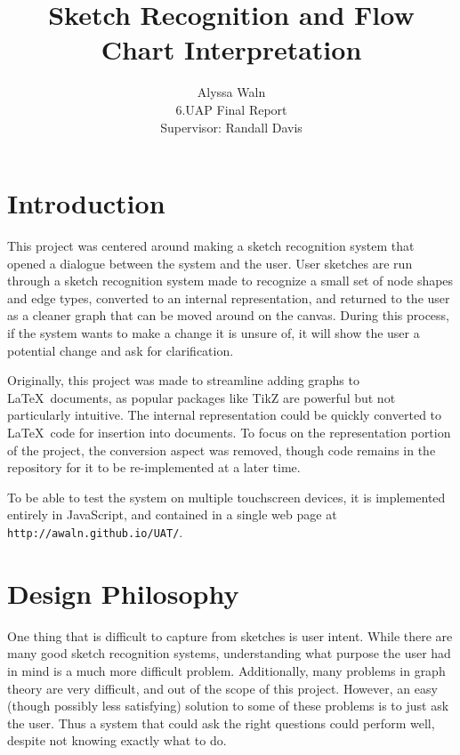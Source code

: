 \documentclass[12pt]{article}
\title{\textbf{Sketch Recognition and Flow Chart Interpretation}}
\author{Alyssa Waln \\ 6.UAP Final Report \\ Supervisor: Randall Davis}
\begin{document}
\maketitle

\tableofcontents

\section{Introduction}
\par This project was centered around making a sketch recognition system that opened a dialogue between the system and the user. User sketches are run through a sketch recognition system made to recognize a small set of node shapes and edge types, converted to an internal representation, and returned to the user as a cleaner graph that can be moved around on the canvas. During this process, if the system wants to make a change it is unsure of, it will show the user a potential change and ask for clarification.\\

\par Originally, this project was made to streamline adding graphs to \LaTeX \ documents, as popular packages like TikZ\cite{TikZ} are powerful but not particularly intuitive. The internal representation could be quickly converted to \LaTeX \ code for insertion into documents. To focus on the representation portion of the project, the conversion aspect was removed, though code remains in the repository\cite{repo} for it to be re-implemented at a later time.

\par To be able to test the system on multiple touchscreen devices, it is implemented entirely in JavaScript, and contained in a single web page at \texttt{http://awaln.github.io/UAT/}.

\section{Design Philosophy}
\par One thing that is difficult to capture from sketches is user intent. While there are many good sketch recognition systems, understanding what purpose the user had in mind is a much more difficult problem. Additionally, many problems in graph theory are very difficult, and out of the scope of this project. However, an easy (though possibly less satisfying) solution to some of these problems is to just ask the user. Thus a system that could ask the right questions could perform well, despite not knowing exactly what to do.\\
\end{document}
